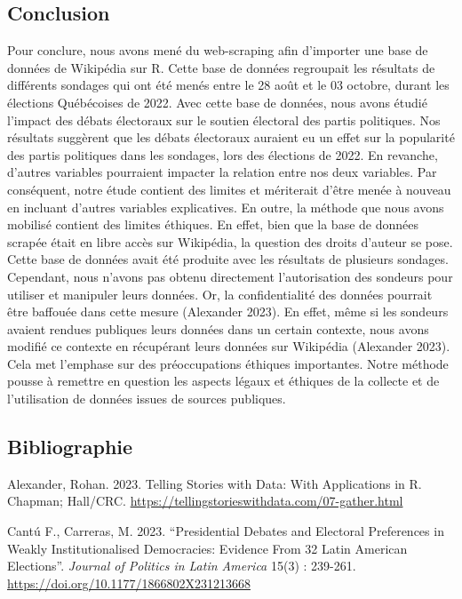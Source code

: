 \documentclass[
  letterpaper,
  DIV=11,
  numbers=noendperiod]{scrartcl}
\begin{document}
\hypertarget{conclusion}{%
\subsection{Conclusion}\label{conclusion}}

Pour conclure, nous avons mené du web-scraping afin d'importer une base
de données de Wikipédia sur R. Cette base de données regroupait les
résultats de différents sondages qui ont été menés entre le 28 août et
le 03 octobre, durant les élections Québécoises de 2022. Avec cette base
de données, nous avons étudié l'impact des débats électoraux sur le
soutien électoral des partis politiques. Nos résultats suggèrent que les
débats électoraux auraient eu un effet sur la popularité des partis
politiques dans les sondages, lors des élections de 2022. En revanche,
d'autres variables pourraient impacter la relation entre nos deux
variables. Par conséquent, notre étude contient des limites et
mériterait d'être menée à nouveau en incluant d'autres variables
explicatives. En outre, la méthode que nous avons mobilisé contient des
limites éthiques. En effet, bien que la base de données scrapée était en
libre accès sur Wikipédia, la question des droits d'auteur se pose.
Cette base de données avait été produite avec les résultats de plusieurs
sondages. Cependant, nous n'avons pas obtenu directement l'autorisation
des sondeurs pour utiliser et manipuler leurs données. Or, la
confidentialité des données pourrait être baffouée dans cette mesure
(Alexander 2023). En effet, même si les sondeurs avaient rendues
publiques leurs données dans un certain contexte, nous avons modifié ce
contexte en récupérant leurs données sur Wikipédia (Alexander 2023).
Cela met l'emphase sur des préoccupations éthiques importantes. Notre
méthode pousse à remettre en question les aspects légaux et éthiques de
la collecte et de l'utilisation de données issues de sources publiques.

\hypertarget{bibliographie}{%
\subsection{Bibliographie}\label{bibliographie}}

Alexander, Rohan. 2023. Telling Stories with Data: With Applications in
R. Chapman; Hall/CRC.
\url{https://tellingstorieswithdata.com/07-gather.html}

Cantú F., Carreras, M. 2023. ``Presidential Debates and Electoral
Preferences in Weakly Institutionalised Democracies: Evidence From 32
Latin American Elections''. \emph{Journal of Politics in Latin America}
15(3) : 239-261. \url{https://doi.org/10.1177/1866802X231213668}
\end{document}
